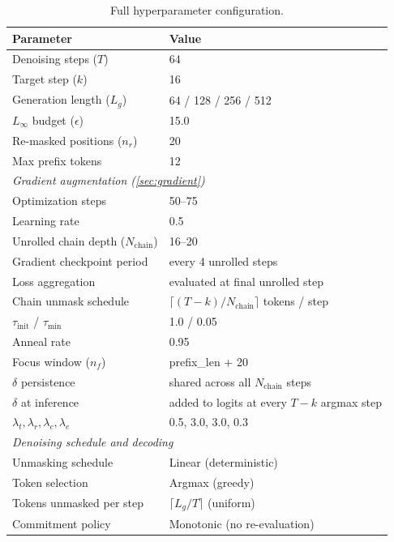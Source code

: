 \documentclass{article}
\theoremstyle{coloredthm}
\begin{document}
\begin{table}[H]
\centering
\small
\begin{tabular}{@{}ll@{}}
\toprule
\textbf{Parameter} & \textbf{Value} \\
\midrule
Denoising steps ($T$) & 64 \\
Target step ($k$) & 16 \\
Generation length ($L_g$) & 64 / 128 / 256 / 512 \\
$L_\infty$ budget ($\epsilon$) & 15.0 \\
Re-masked positions ($n_r$) & 20 \\
Max prefix tokens & 12 \\
\midrule
\multicolumn{2}{l}{\textit{Gradient augmentation (\cref{sec:gradient})}} \\
Optimization steps & 50--75 \\
Learning rate & 0.5 \\
Unrolled chain depth ($N_{\text{chain}}$) & 16--20 \\
Gradient checkpoint period & every 4 unrolled steps \\
Loss aggregation & evaluated at final unrolled step \\
Chain unmask schedule & $\lceil (T-k) / N_{\text{chain}} \rceil$ tokens / step \\
$\tau_{\text{init}}$ / $\tau_{\text{min}}$ & 1.0 / 0.05 \\
Anneal rate & 0.95 \\
Focus window ($n_f$) & prefix\_len + 20 \\
$\delta$ persistence & shared across all $N_{\text{chain}}$ steps \\
$\delta$ at inference & added to logits at every $T-k$ argmax step \\
$\lambda_t, \lambda_r, \lambda_c, \lambda_e$ & 0.5, 3.0, 3.0, 0.3 \\
\midrule
\multicolumn{2}{l}{\textit{Denoising schedule and decoding}} \\
Unmasking schedule & Linear (deterministic) \\
Token selection & Argmax (greedy) \\
Tokens unmasked per step & $\lceil L_g / T \rceil$ (uniform) \\
Commitment policy & Monotonic (no re-evaluation) \\
\bottomrule
\end{tabular}
\caption{Full hyperparameter configuration.}
\label{tab:hyperparams}
\end{table}
\end{document}

